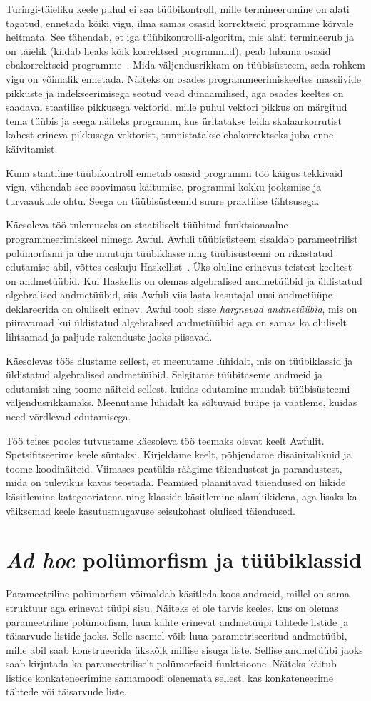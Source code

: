 \documentclass[12pt]{article}
\newcommand\peatykk[1]{
  \clearpage
  \section{#1}}
\begin{document}
    Turingi-täieliku keele puhul ei saa tüübikontroll, mille termineerumine on alati tagatud, ennetada kõiki vigu, ilma samas osasid korrektseid programme kõrvale heitmata. See tähendab, et iga tüübikontrolli-algoritm, mis alati termineerub ja on täielik (kiidab heaks kõik korrektsed programmid), peab lubama osasid ebakorrektseid programme~\cite{Typ}. Mida väljendusrikkam on tüübisüsteem, seda rohkem vigu on võimalik ennetada. Näiteks on osades programmeerimiskeeltes massiivide pikkuste ja indekseerimisega seotud vead dünaamilised, aga osades keeltes on saadaval staatilise pikkusega vektorid, mille puhul vektori pikkus on märgitud tema tüübis ja seega näiteks programm, kus üritatakse leida skalaarkorrutist kahest erineva pikkusega vektorist, tunnistatakse ebakorrektseks juba enne käivitamist.

    Kuna staatiline tüübikontroll ennetab osasid programmi töö käigus tekkivaid vigu, vähendab see soovimatu käitumise, programmi kokku jooksmise ja turvaaukude ohtu. Seega on tüübisüsteemid suure praktilise tähtsusega.

    Käesoleva töö tulemuseks on staatiliselt tüübitud funktsionaalne programmeerimiskeel nimega Awful. Awfuli tüübisüsteem sisaldab parameetrilist polümorfismi ja ühe muutuja tüübiklasse ning tüübisüsteemi on rikastatud edutamise abil, võttes eeskuju Haskellist~\cite{Giv}. Üks oluline erinevus teistest keeltest on andmetüübid. Kui Haskellis on olemas algebralised andmetüübid ja üldistatud algebralised andmetüübid, siis Awfuli viis lasta kasutajal uusi andmetüüpe deklareerida on oluliselt erinev. Awful toob sisse \textit{hargnevad andmetüübid}, mis on piiravamad kui üldistatud algebralised andmetüübid aga on samas ka oluliselt lihtsamad ja paljude rakenduste jaoks piisavad.

    Käesolevas töös alustame sellest, et meenutame lühidalt, mis on tüübiklassid ja üldistatud algebralised andmetüübid. Selgitame tüübitaseme andmeid ja edutamist ning toome näiteid sellest, kuidas edutamine muudab tüübisüsteemi väljendusrikkamaks. Meenutame lühidalt ka sõltuvaid tüüpe ja vaatleme, kuidas need võrdlevad edutamisega.

    Töö teises pooles tutvustame käesoleva töö teemaks olevat keelt Awfulit. Spetsifitseerime keele süntaksi. Kirjeldame keelt, põhjendame disainivalikuid ja toome koodinäiteid. Viimases peatükis räägime täiendustest ja parandustest, mida on tulevikus kavas teostada. Peamised plaanitavad täiendused on liikide käsitlemine kategooriatena ning klasside käsitlemine alamliikidena, aga lisaks ka väiksemad keele kasutusmugavuse seisukohast olulised täiendused.
  \peatykk{\textit{Ad hoc} polümorfism ja tüübiklassid}
    Parameetriline polümorfism võimaldab käsitleda koos andmeid, millel on sama struktuur aga erinevat tüüpi sisu. Näiteks ei ole tarvis keeles, kus on olemas parameetriline polümorfism, luua kahte erinevat andmetüüpi tähtede listide ja täisarvude listide jaoks. Selle asemel võib luua parametriseeritud andmetüübi, mille abil saab konstrueerida ükskõik millise sisuga liste. Sellise andmetüübi jaoks saab kirjutada ka parameetriliselt polümorfseid funktsioone. Näiteks käitub listide konkateneerimine samamoodi olenemata sellest, kas konkateneerime tähtede või täisarvude liste.
\end{document}
